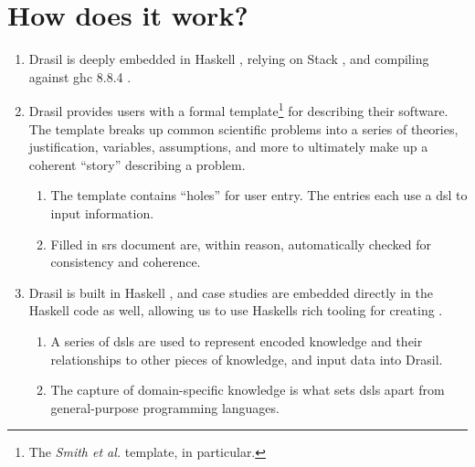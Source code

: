 \section{How does it work?}
\label{chap:drasil:sec:how-does-it-work}


\begin{enumerate}

      \item Drasil is deeply embedded in Haskell \cite{Haskell2010}, relying on
            Stack \cite{HaskellStack}, and compiling against \acs{ghc} 8.8.4
            \cite{GHC884}.

      \item Drasil provides users with a formal  template\footnote{The
                  \textit{Smith et al.} \cite{SmithAndLai2005} template, in
                  particular.} for describing their software. The template
            breaks up common scientific problems into a series of
            theories, justification, variables, assumptions, and more to
            ultimately make up a coherent ``story'' describing a problem.

            \begin{enumerate}

                  \item The template contains ``holes'' for user entry. The
                        entries each use a \acs{dsl} to input information.

                  \item Filled in \acs{srs} document are, within reason,
                        automatically checked for consistency and coherence.

            \end{enumerate}

      \item Drasil is built in Haskell \cite{Haskell2010}, and case studies are
            embedded directly in the Haskell code as well, allowing us to use
            Haskells rich tooling for creating .
            \begin{enumerate}

                  \item A series of \acsp{dsl} are used to represent encoded
                        knowledge and their relationships to other pieces of
                        knowledge, and input data into Drasil.

                  \item The capture of domain-specific knowledge is what sets
                        \acsp{dsl} apart from general-purpose programming
                        languages.


\end{enumerate}
\end{enumerate}

